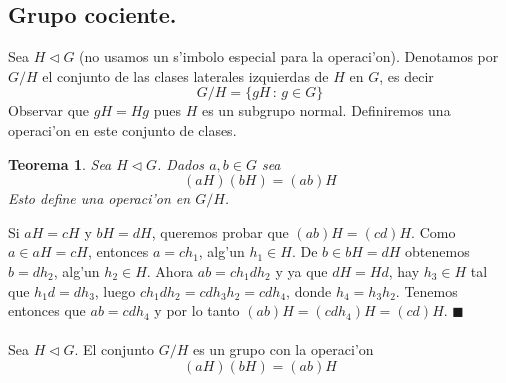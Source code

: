 \documentclass[a4paper,openright,12pt]{report}
\numberwithin{equation}{section} %
\newtheorem{teorema}{Teorema}[section] %
\newenvironment{proof}{\noindent{\it Demostracion:}}{\hfill$\blacksquare$} %
\begin{document}
\subsection{Grupo cociente.}
Sea $H \triangleleft G$ (no usamos un s'imbolo especial para la operaci'on). Denotamos por $G/H$ el conjunto de las clases laterales izquierdas de $H$ en $G$, es decir
\[
G/H=\{gH\,:\, g\in G\}
\]
Observar que $gH=Hg$ pues $H$ es un subgrupo normal. Definiremos una operaci'on en este conjunto de clases.
\begin{teorema}
Sea $H \triangleleft G$. Dados $a,b \in G$ sea 
\[
(aH)(bH)=(ab)H
\]
Esto define una operaci'on en $G/H$.
\end{teorema}
\begin{proof}
Si $aH=cH$ y $bH=dH$, queremos probar que $(ab)H=(cd)H$. Como $a \in aH = cH$, entonces $a=ch_{1}$, alg'un $h_{1}\in H$. De $b \in bH=dH$ obtenemos $b=dh_{2}$, alg'un $h_{2}\in H$. Ahora $ab=ch_{1}dh_{2}$ y ya que $dH=Hd$, hay $h_{3}\in H$ tal que $h_{1}d=dh_{3}$, luego $ch_{1}dh_{2}=cdh_{3}h_{2}=cdh_{4}$, donde $h_{4}=h_{3}h_{2}$. Tenemos entonces que $ab=cdh_{4}$ y por lo tanto $(ab)H=(cdh_{4})H=(cd)H$.
\end{proof}
\\
\\
Sea $H \triangleleft G$. El conjunto $G/H$ es un grupo con la operaci'on 
\[
(aH)(bH)=(ab)H
\]
\end{document}
